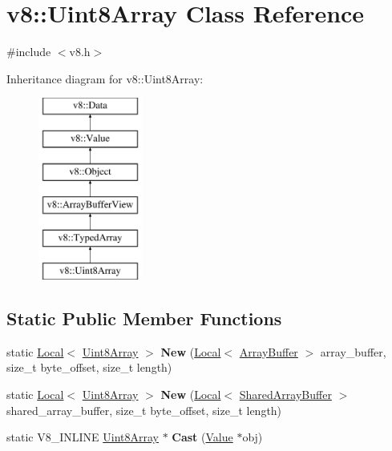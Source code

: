 \hypertarget{classv8_1_1Uint8Array}{}\section{v8\+:\+:Uint8\+Array Class Reference}
\label{classv8_1_1Uint8Array}


{\ttfamily \#include $<$v8.\+h$>$}

Inheritance diagram for v8\+:\+:Uint8\+Array\+:\begin{figure}[H]
\begin{center}
\leavevmode
\includegraphics[height=6.000000cm]{classv8_1_1Uint8Array}
\end{center}
\end{figure}
\subsection*{Static Public Member Functions}
\begin{DoxyCompactItemize}
\item 
\mbox{\label{classv8_1_1Uint8Array_a8262a637cc67c57669adcf5a18bcd29a}} 
static \mbox{\hyperlink{classv8_1_1Local}{Local}}$<$ \mbox{\hyperlink{classv8_1_1Uint8Array}{Uint8\+Array}} $>$ {\bfseries New} (\mbox{\hyperlink{classv8_1_1Local}{Local}}$<$ \mbox{\hyperlink{classv8_1_1ArrayBuffer}{Array\+Buffer}} $>$ array\+\_\+buffer, size\+\_\+t byte\+\_\+offset, size\+\_\+t length)
\item 
\mbox{\label{classv8_1_1Uint8Array_a07d1f8e3377ddb6af3b423ed0d0f5d26}} 
static \mbox{\hyperlink{classv8_1_1Local}{Local}}$<$ \mbox{\hyperlink{classv8_1_1Uint8Array}{Uint8\+Array}} $>$ {\bfseries New} (\mbox{\hyperlink{classv8_1_1Local}{Local}}$<$ \mbox{\hyperlink{classv8_1_1SharedArrayBuffer}{Shared\+Array\+Buffer}} $>$ shared\+\_\+array\+\_\+buffer, size\+\_\+t byte\+\_\+offset, size\+\_\+t length)
\item 
\mbox{\label{classv8_1_1Uint8Array_a3bf7e458abe0be9bc943ba2de6c4f432}} 
static V8\+\_\+\+I\+N\+L\+I\+NE \mbox{\hyperlink{classv8_1_1Uint8Array}{Uint8\+Array}} $\ast$ {\bfseries Cast} (\mbox{\hyperlink{classv8_1_1Value}{Value}} $\ast$obj)
\end{DoxyCompactItemize}
